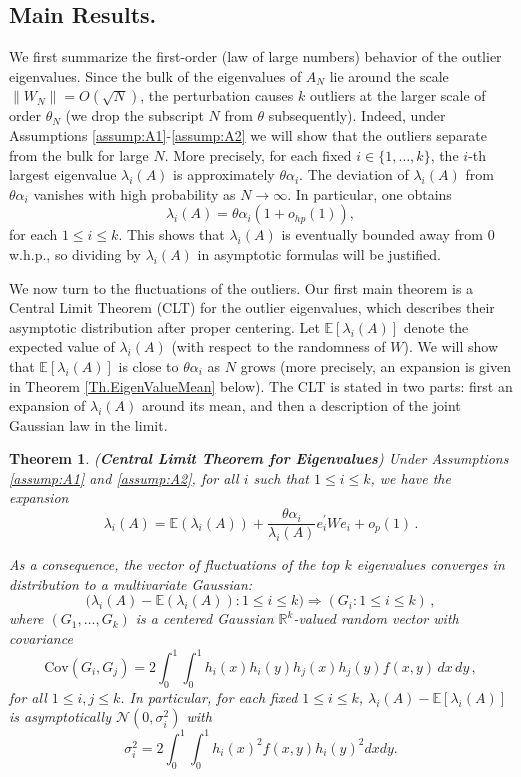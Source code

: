 \documentclass[11pt, reqno]{amsart}
\numberwithin{equation}{section}
\newtheorem{theorem}{Theorem}[section]
\newcommand{\E}{\mbox{${\mathbb E}$}}
\begin{document}
\subsection{Main Results.} \label{subsec:mainresults}

We first summarize the first-order (law of large numbers) behavior of the outlier eigenvalues. Since the bulk of the eigenvalues of $A_N$ lie around the scale $\|W_N\| = O(\sqrt{N})$, the perturbation causes $k$ outliers at the larger scale of order $\theta_N$ (we drop the subscript $N$ from $\theta$ subsequently). Indeed, under Assumptions \ref{assump:A1}-\ref{assump:A2} we will show that the outliers separate from the bulk for large $N$. More precisely, for each fixed $i \in \{1,\ldots,k\}$, the $i$-th largest eigenvalue $\lambda_i(A)$ is approximately $\theta \alpha_i$. The deviation of $\lambda_i(A)$ from $\theta \alpha_i$ vanishes with high probability as $N\to\infty$. In particular, one obtains
\[
\lambda_i(A) = \theta \alpha_i \left(1 + o_{hp}(1)\right),
\]
for each $1\le i\le k$. This shows that $\lambda_i(A)$ is eventually bounded away from 0 w.h.p., so dividing by $\lambda_i(A)$ in asymptotic formulas will be justified. 

We now turn to the fluctuations of the outliers. Our first main theorem is a Central Limit Theorem (CLT) for the outlier eigenvalues, which describes their asymptotic distribution after proper centering. Let $\mathbb{E}[\lambda_i(A)]$ denote the expected value of $\lambda_i(A)$ (with respect to the randomness of $W$). We will show that $\mathbb{E}[\lambda_i(A)]$ is close to $\theta \alpha_i$ as $N$ grows (more precisely, an expansion is given in Theorem \ref{Th.EigenValueMean} below). The CLT is stated in two parts: first an expansion of $\lambda_i(A)$ around its mean, and then a description of the joint Gaussian law in the limit.
\begin{theorem}\label{Th.EigenValueCLT} ({\bf Central Limit Theorem for Eigenvalues}) Under Assumptions \eqref{assump:A1} and \eqref{assump:A2}, for all $i$ such that $1 \leq i \leq k$, we have the expansion
\[
\lambda_i(A) = \mathbb E \left(\lambda_i(A)\right) + \frac{\theta \alpha_i}{\lambda_i(A)} e_i^\prime We_i + o_p(1)\,.
\]

As a consequence, the vector of fluctuations of the top $k$ eigenvalues converges in distribution to a multivariate Gaussian:
\[
\bigg (\lambda_i(A) - \mathbb E(\lambda_i(A)) : 1 \leq i \leq k\bigg ) \Rightarrow (G_i : 1 \leq i \leq k)\,,
\]
where $(G_1,\ldots,G_k)$ is a centered Gaussian $\mathbb R^k$-valued random vector with covariance
\[
\mathrm{Cov}(G_i,G_j) = 2 \int_0^1 \int_0^1 h_i(x) h_i(y) h_j(x) h_j(y) f(x,y)\,dx\,dy \,,
\]
for all $1 \le i,j \le k$. In particular, for each fixed $1\le i\le k$, $\lambda_i(A)-\E[\lambda_i(A)]$ is asymptotically $\mathcal{N}( 0, \sigma_i^2 )$ with
$$\sigma_i^2=2 \int_0^1 \int_0^1 h_i(x)^2 f(x, y) h_i(y)^2 d x d y.$$

\end{theorem}
\end{document}

